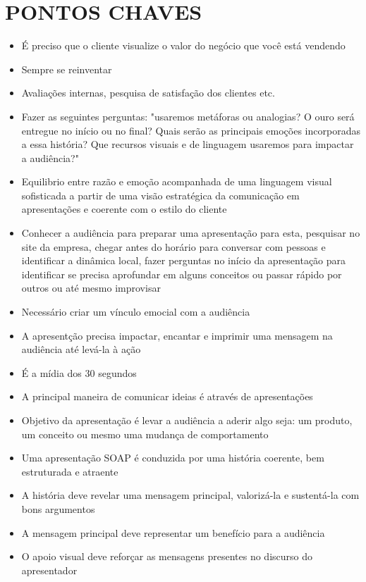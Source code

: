 \chapter{PONTOS CHAVES}
\label{chap:keypoints}
\begin{itemize}
    \item É preciso que o cliente visualize o valor do negócio que você está vendendo
    \item Sempre se reinventar 
    \item Avaliações internas, pesquisa de satisfação dos clientes etc.
    \item Fazer as seguintes perguntas: "usaremos metáforas ou analogias? O ouro será entregue no início ou no final? Quais serão as principais emoções incorporadas a essa história? Que recursos visuais e de linguagem usaremos para impactar a audiência?"
    \item Equilibrio entre razão e emoção acompanhada de uma linguagem visual sofisticada a partir de uma visão estratégica da comunicação em apresentações e coerente com o estilo do cliente
    \item Conhecer a audiência para preparar uma apresentação para esta, pesquisar no site da empresa, chegar antes do horário para conversar com pessoas e identificar a dinâmica local, fazer perguntas no início da apresentação para identificar se precisa aprofundar em alguns conceitos ou passar rápido por outros ou até mesmo improvisar
    \item Necessário criar um vínculo emocial com a audiência
    \item A apresentção precisa impactar, encantar e imprimir uma mensagem na audiência até levá-la à ação
    \item É a mídia dos 30 segundos
    \item A principal maneira de comunicar ideias é através de apresentações
    \item Objetivo da apresentação é levar a audiência a aderir algo seja: um produto, um conceito ou mesmo uma mudança de comportamento
    \item Uma apresentação SOAP é conduzida por uma história coerente, bem estruturada e atraente
    \item A história deve revelar uma mensagem principal, valorizá-la e sustentá-la com bons argumentos
    \item A mensagem principal deve representar um benefício para a audiência
    \item O apoio visual deve reforçar as mensagens presentes no discurso do apresentador

\end{itemize}
